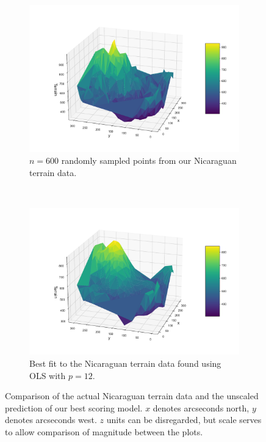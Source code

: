 \documentclass[twocolumn,english,notitlepage]{article}
\begin{document}
        \begin{figure} [ht]
            \begin{subfigure}{\linewidth}
                \centering
                \includegraphics[width=.9\linewidth]{Nica_test_plot.pdf}
                \caption{$n=600$ randomly sampled points from our Nicaraguan terrain data.}
                \label{res:subfig:Nica_test}
            \end{subfigure}
            \\
            \begin{subfigure}{\linewidth}
                \centering
                \includegraphics[width=.9\linewidth]{Nica_predict_plot.pdf}
                \caption{Best fit to the Nicaraguan terrain data found using OLS with $p=12$.}
                \label{res:subfig:Nica_predict}
            \end{subfigure}
            \caption{Comparison of the actual Nicaraguan terrain data and the unscaled prediction of our best scoring model. $x$ denotes arcseconds north, $y$ denotes arcseconds west. $z$ units can be disregarded, but scale serves to allow comparison of magnitude between the plots.}
            \label{res:fig:Nica_terrain}
        \end{figure}
\end{document}
